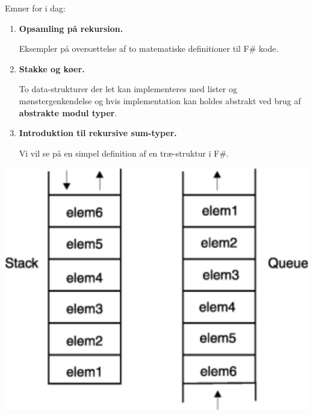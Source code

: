 \documentclass[rgb]{beamer}
\begin{document}
\popmaketitleframe


\begin{frame}[fragile]
\begin{footnotesize}


  \vspace{1ex}
  Emner for i dag:

  \vspace{1ex}

\begin{minipage}[b]{0.6\textwidth}

  \begin{enumerate}
  \item \textbf{Opsamling på rekursion.}

    Eksempler på oversættelse af to matematiske definitioner til F\# kode.

  \item \textbf{Stakke og køer.}

    To data-strukturer der let kan implementeres med lister og mønstergenkendelse og hvis
    implementation kan holdes abstrakt ved brug af \textbf{abstrakte
      modul typer}.

  \item \textbf{Introduktion til rekursive sum-typer.}

    Vi vil se på en simpel definition af en træ-struktur i F\#.
  \end{enumerate}
\end{minipage} \hspace{-2mm}
\begin{minipage}[b]{0.3\textwidth}

  \includegraphics[width=1.4\textwidth]{../images/lifofifo.png}


\end{minipage}
\end{footnotesize}
\end{frame}
\end{document}
